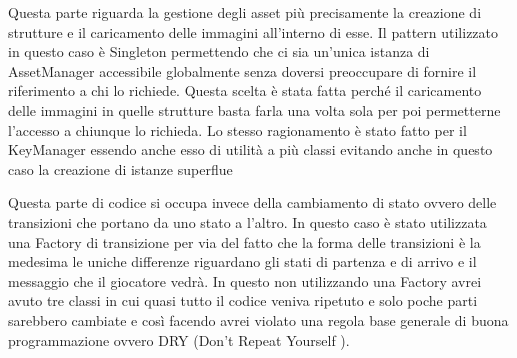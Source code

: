 \documentclass[a4paper,12pt]{report}
\begin{document}
    \par Questa parte riguarda la gestione degli asset più precisamente la creazione di strutture e il caricamento delle
    immagini all’interno di esse. Il pattern utilizzato in questo caso è Singleton permettendo che ci sia un'unica istanza
    di AssetManager accessibile globalmente senza doversi preoccupare di fornire il riferimento a chi lo richiede.
    Questa scelta è stata fatta perché il caricamento delle immagini in quelle strutture basta farla una volta sola per poi
    permetterne l’accesso a chiunque lo richieda. Lo stesso ragionamento è stato fatto per il KeyManager essendo anche esso
    di utilità a più classi evitando anche in questo caso la creazione di istanze superflue
    \par Questa parte di codice si occupa invece della cambiamento di stato ovvero delle transizioni che portano da uno stato
    a l’altro. In questo caso è stato utilizzata una Factory di transizione per via del fatto che la forma delle transizioni
    è la medesima  le uniche differenze riguardano gli stati di partenza e di arrivo e il messaggio che il giocatore vedrà.
    In questo non utilizzando una Factory avrei avuto tre classi in cui quasi tutto il codice veniva ripetuto e solo poche
    parti sarebbero cambiate  e così facendo avrei violato una regola base generale di buona programmazione ovvero
    DRY (Don’t Repeat Yourself ).
\end{document}

